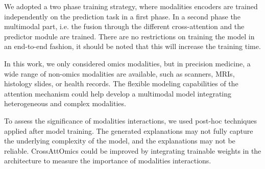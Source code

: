 \documentclass[../main.tex]{subfiles}
\begin{document}
 We adopted a two phase training strategy, where modalities encoders are trained independently on the prediction task in a first phase.
 In a second phase the multimodal part, i.e. the fusion through the different cross-attention and the predictor module are trained.
 There are no restrictions on training the model in an end-to-end fashion, it should be noted that this will increase the training time.

 In this work, we only considered omics modalities, but in precision medicine, a wide range of non-omics modalities are available, such as scanners, MRIs, histology slides, or health records.
 The flexible modeling capabilities of the attention mechanism could help develop a multimodal model integrating heterogeneous and complex modalities.

 To assess the significance of modalities interactions, we used post-hoc techniques applied after model training.
 The generated explanations may not fully capture the underlying complexity of the model, and the explanations may not be reliable.
 CrossAttOmics could be improved by integrating trainable weights in the architecture to measure the importance of modalities interactions.
\end{document}
